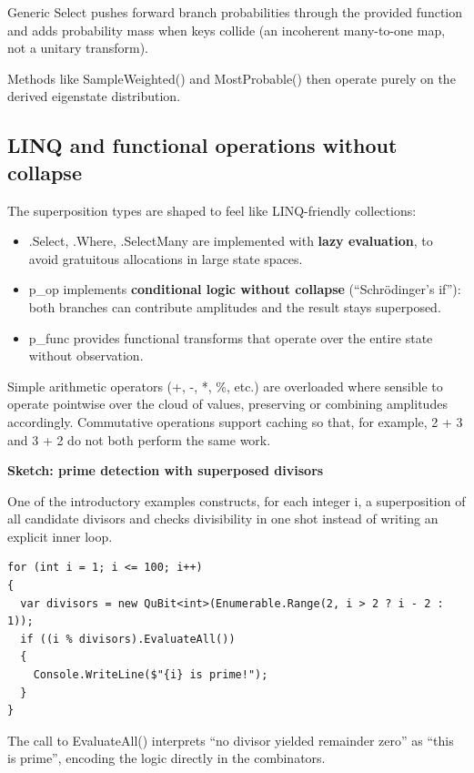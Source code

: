 \documentclass[a4paper,11pt]{article}
\begin{document}
Generic Select pushes forward branch probabilities through the provided function and adds probability mass when keys collide (an incoherent many-to-one map, not a unitary transform).

Methods like SampleWeighted() and MostProbable() then operate purely on the derived eigenstate distribution.

\subsection{LINQ and functional operations without collapse}

The superposition types are shaped to feel like LINQ-friendly collections:

\begin{itemize}
\item
  .Select, .Where, .SelectMany are implemented with \textbf{lazy evaluation}, to avoid gratuitous allocations in large state spaces.
\item
  p\_op implements \textbf{conditional logic without collapse} (``Schrödinger's if''): both branches can contribute amplitudes and the result stays superposed.
\item
  p\_func provides functional transforms that operate over the entire state without observation.
\end{itemize}

Simple arithmetic operators (+, -, *, \%, etc.) are overloaded where sensible to operate pointwise over the cloud of values, preserving or combining amplitudes accordingly. Commutative operations support caching so that, for example, 2 + 3 and 3 + 2 do not both perform the same work.

\textbf{Sketch: prime detection with superposed divisors}

One of the introductory examples constructs, for each integer i, a superposition of all candidate divisors and checks divisibility in one shot instead of writing an explicit inner loop.

\begin{lstlisting}[style=codeblock]
for (int i = 1; i <= 100; i++)
{
  var divisors = new QuBit<int>(Enumerable.Range(2, i > 2 ? i - 2 : 1));
  if ((i % divisors).EvaluateAll())
  {
    Console.WriteLine($"{i} is prime!");
  }
}
\end{lstlisting}

The call to EvaluateAll() interprets ``no divisor yielded remainder zero'' as ``this is prime'', encoding the logic directly in the combinators.
\end{document}
